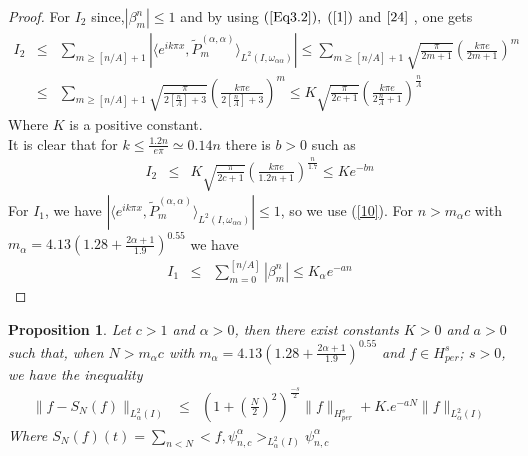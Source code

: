 \documentclass[]{article}
\newtheorem{proposition}{Proposition}
\newcommand\ds{\displaystyle}
\begin{document}
\begin{proof}
	
	For $I_2$ since,$|\beta_m^n|\leq1$ and by using $(\ref{Eq3.2}), \;  (\ref{1})$ and $\eqref{24}$ , one gets
	\begin{eqnarray}
	I_2&\leq& \ds{ \sum_{m\geq {[n/A]}+1}} |\langle e^{ik\pi x}, \tilde{P}_{m}^{(\alpha,\alpha)}\rangle _{L^2(I,\omega_{\alpha\alpha})}|
	\leq \ds{ \sum_{m\geq {[n/A]}+1}}\sqrt{\frac{\pi}{2m+1 }}\left(\frac{{k\pi e}}{2m +1} \right)^m\nonumber\\
	&\leq& \ds{ \sum_{m\geq {[n/A]}+1}}\sqrt{\frac{\pi}{2[\frac{n}{A}]+3 }}\left(\frac{{k\pi e}}{2[\frac{n}{A}]+3} \right)^m
	\leq K\sqrt{\frac{\pi}{2c+1 }}\left(\frac{{k\pi e}}{2\frac{n}{A}+1} \right)^{\frac{n}{A}}
	\end{eqnarray}
	Where $K$ is a positive constant. \\
	It is clear that for $k\leq \frac{1.2n}{e\pi}\simeq 0.14n$ there is $b>0 $ such as
	\begin{eqnarray}
	I_2 &\leq &K\sqrt{\frac{\pi}{2c+1 }}\left(\frac{{k\pi e}}{1.2n+1} \right)^{\frac{n}{1.7}}
	\leq K e^{-bn}
	\end{eqnarray}
	For $I_1 $, we have $|\langle e^{ik\pi x}, \tilde{P}_{m}^{(\alpha,\alpha)}\rangle _{L^2(I,\omega_{\alpha\alpha})}|\leq 1$, so we use (\ref{10}). For  $n> m_{\alpha}c$ with $m_{\alpha}=4.13\left(1.28+\frac{2\alpha+1}{1.9}\right)^{0.55}$ we have
	\begin{eqnarray}
	I_1 &\leq & \ds {\sum_{m= 0} ^{[n/A]}}|\beta_m^n|\leq K_{\alpha} e^{-an}
	\end{eqnarray}
	
\end{proof}


\begin{proposition}
	Let $c>1$ and $\alpha  >0 $, then there exist constants $K>0$ and $a>0$ such that, when
	$N > m_{\alpha}c$ with $m_{\alpha}=4.13\left(1.28+\frac{2\alpha+1}{1.9}\right)^{0.55}$   and $f \in H^s_{per}$; $s > 0$, we have the inequality
	\begin{eqnarray} \label{ineq}
	\|f-S_N(f)\|_{L^2_{\alpha}(I)} &\leq& \left(1+ \left(\frac{N}{2}\right)^2\right)^{\frac{-s}{2}} \|f\|_{H^s_{per}} +K.e^{-a N}\|f\|_{L^2_{\alpha}(I)}\label{8}
	\end{eqnarray}
	Where $S_N(f)(t)=\ds{\sum_{n<N}}<f,\psi_{n,c}^{\alpha}>_{L^2_{\alpha}(I)}\psi_{n,c}^{\alpha}$
	
\end{proposition}
\end{document}
